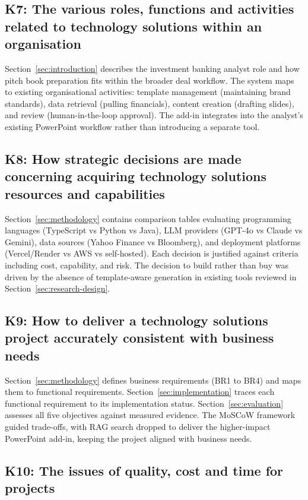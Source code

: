 \subsection*{K7: The various roles, functions and activities related to technology solutions within an organisation}

Section~\ref{sec:introduction} describes the investment banking analyst role and how pitch book preparation fits within the broader deal workflow. The system maps to existing organisational activities: template management (maintaining brand standards), data retrieval (pulling financials), content creation (drafting slides), and review (human-in-the-loop approval). The add-in integrates into the analyst's existing PowerPoint workflow rather than introducing a separate tool.

\subsection*{K8: How strategic decisions are made concerning acquiring technology solutions resources and capabilities}

Section~\ref{sec:methodology} contains comparison tables evaluating programming languages (TypeScript vs Python vs Java), LLM providers (GPT-4o vs Claude vs Gemini), data sources (Yahoo Finance vs Bloomberg), and deployment platforms (Vercel/Render vs AWS vs self-hosted). Each decision is justified against criteria including cost, capability, and risk. The decision to build rather than buy was driven by the absence of template-aware generation in existing tools reviewed in Section~\ref{sec:research-design}.

\subsection*{K9: How to deliver a technology solutions project accurately consistent with business needs}

Section~\ref{sec:methodology} defines business requirements (BR1 to BR4) and maps them to functional requirements. Section~\ref{sec:implementation} traces each functional requirement to its implementation status. Section~\ref{sec:evaluation} assesses all five objectives against measured evidence. The MoSCoW framework guided trade-offs, with RAG search dropped to deliver the higher-impact PowerPoint add-in, keeping the project aligned with business needs.

\subsection*{K10: The issues of quality, cost and time for projects}


